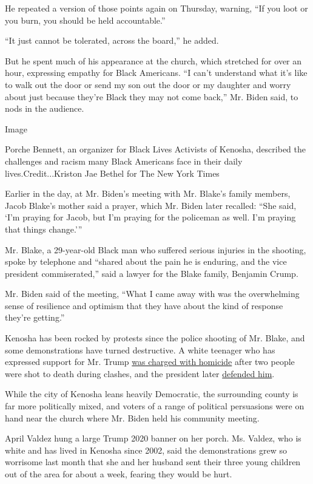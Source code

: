 He repeated a version of those points again on Thursday, warning, ``If
you loot or you burn, you should be held accountable.''

``It just cannot be tolerated, across the board,'' he added.

But he spent much of his appearance at the church, which stretched for
over an hour, expressing empathy for Black Americans. ``I can't
understand what it's like to walk out the door or send my son out the
door or my daughter and worry about just because they're Black they may
not come back,'' Mr. Biden said, to nods in the audience.

Image

Porche Bennett, an organizer for Black Lives Activists of Kenosha,
described the challenges and racism many Black Americans face in their
daily lives.Credit...Kriston Jae Bethel for The New York Times

Earlier in the day, at Mr. Biden's meeting with Mr. Blake's family
members, Jacob Blake's mother said a prayer, which Mr. Biden later
recalled: ``She said, `I'm praying for Jacob, but I'm praying for the
policeman as well. I'm praying that things change.'''

Mr. Blake, a 29-year-old Black man who suffered serious injuries in the
shooting, spoke by telephone and ``shared about the pain he is enduring,
and the vice president commiserated,'' said a lawyer for the Blake
family, Benjamin Crump.

Mr. Biden said of the meeting, ``What I came away with was the
overwhelming sense of resilience and optimism that they have about the
kind of response they're getting.''

Kenosha has been rocked by protests since the police shooting of Mr.
Blake, and some demonstrations have turned destructive. A white teenager
who has expressed support for Mr. Trump
\href{https://www.nytimes3xbfgragh.onion/2020/08/27/us/kyle-rittenhouse-kenosha.html}{was
charged with homicide} after two people were shot to death during
clashes, and the president later
\href{https://www.nytimes3xbfgragh.onion/live/2020/08/31/us/trump-vs-biden/president-trump-calls-his-supporters-peaceful-and-defends-a-17-year-old-who-shot-three-people-in-wisconsin}{defended
him}.

While the city of Kenosha leans heavily Democratic, the surrounding
county is far more politically mixed, and voters of a range of political
persuasions were on hand near the church where Mr. Biden held his
community meeting.

April Valdez hung a large Trump 2020 banner on her porch. Ms. Valdez,
who is white and has lived in Kenosha since 2002, said the
demonstrations grew so worrisome last month that she and her husband
sent their three young children out of the area for about a week,
fearing they would be hurt.

